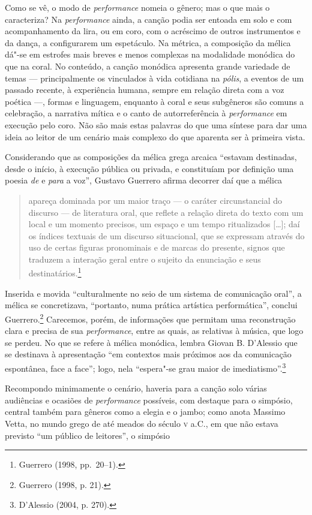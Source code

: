Como se vê, o modo de \textit{performance} nomeia o gênero;
mas o que mais o caracteriza? Na \textit{performance} ainda, a canção podia ser
entoada em solo e com acompanhamento da lira, ou em coro, com o acréscimo de
outros instrumentos e da dança, a configurarem um espetáculo. Na métrica, a
composição da mélica dá"-se em estrofes mais breves e menos
complexas na modalidade monódica do que na coral. No conteúdo, a canção
monódica apresenta grande variedade de temas --- principalmente os vinculados à
vida cotidiana na \textit{pólis}, a eventos de um passado recente, à
experiência humana, sempre em relação direta com a voz poética ---, formas e
linguagem, enquanto à coral e seus subgêneros são comuns a celebração, a
narrativa mítica e o canto de autorreferência à \textit{performance} em
execução pelo coro. Não são mais estas palavras do que uma síntese para dar uma ideia ao leitor de um cenário mais complexo do que aparenta ser à primeira vista. 

Considerando que as composições da mélica grega arcaica “estavam destinadas,
desde o início, à execução pública ou privada, e constituíam por definição uma
poesia \textit{de} e \textit{para} a voz”, Gustavo Guerrero
afirma decorrer daí que a mélica

\begin{quote}
apareça dominada por um maior traço --- o caráter circunstancial do discurso --- de
literatura oral, que reflete a relação direta do texto com um local e um
momento precisos, um espaço e um tempo ritualizados [\ldots{}]; daí os índices
textuais de um discurso situacional, que se expressam através do uso de certas
figuras pronominais e de marcas do presente, signos que traduzem a interação
geral entre o sujeito da enunciação e seus destinatários.\footnote{ Guerrero (1998, pp.~20--1).}
\end{quote}

Inserida e movida “culturalmente no seio de um sistema de comunicação oral”, a
mélica se concretizava, “portanto, numa prática artística performática”,
conclui Guerrero.\footnote{ Guerrero (1998, p. 21).} Carecemos, porém, de informações que permitam uma
reconstrução clara e precisa de sua \textit{performance}, entre as quais, as
relativas à música, que logo se perdeu. No que se refere à mélica monódica,
lembra Giovan B. D’Alessio que se destinava à apresentação “em
contextos mais próximos aos da comunicação espontânea, face a face”; logo, nela
“espera"-se grau maior de imediatismo”.\footnote{ D’Alessio (2004, p. 270).} 

Recompondo minimamente o cenário, haveria para a canção solo várias audiências e
ocasiões de \textit{performance} possíveis, com destaque para o simpósio,
central também para gêneros como a elegia e o jambo; como anota Massimo Vetta,
no mundo grego de até meados do século \textsc{v} a.C., em que não
estava previsto “um público de leitores”, o simpósio 

